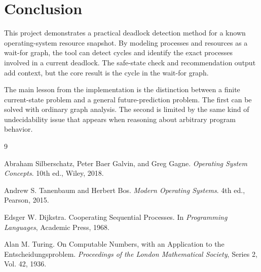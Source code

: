\documentclass[10pt]{article}
\begin{document}
\section{Conclusion}

This project demonstrates a practical deadlock detection method for a known operating-system resource snapshot. By modeling processes and resources as a wait-for graph, the tool can detect cycles and identify the exact processes involved in a current deadlock. The safe-state check and recommendation output add context, but the core result is the cycle in the wait-for graph.

The main lesson from the implementation is the distinction between a finite current-state problem and a general future-prediction problem. The first can be solved with ordinary graph analysis. The second is limited by the same kind of undecidability issue that appears when reasoning about arbitrary program behavior.

\begin{thebibliography}{9}

Abraham Silberschatz, Peter Baer Galvin, and Greg Gagne.
\textit{Operating System Concepts}.
10th ed., Wiley, 2018.

Andrew S. Tanenbaum and Herbert Bos.
\textit{Modern Operating Systems}.
4th ed., Pearson, 2015.

Edsger W. Dijkstra.
Cooperating Sequential Processes.
In \textit{Programming Languages}, Academic Press, 1968.

Alan M. Turing.
On Computable Numbers, with an Application to the Entscheidungsproblem.
\textit{Proceedings of the London Mathematical Society}, Series 2, Vol. 42, 1936.

\end{thebibliography}
\end{document}
